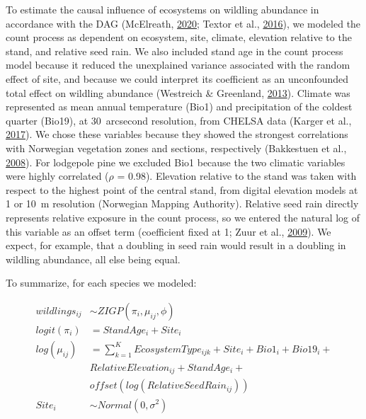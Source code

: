 \documentclass[
]{article}
\begin{document}
To estimate the causal influence of ecosystems on wildling abundance in accordance with the DAG (McElreath, \protect\hyperlink{ref-mcelreathHauntedDAGCausal2020}{2020}; Textor et al., \protect\hyperlink{ref-textorRobustCausalInference2016}{2016}), we modeled the count process as dependent on ecosystem, site, climate, elevation relative to the stand, and relative seed rain.
We also included stand age in the count process model because it reduced the unexplained variance associated with the random effect of site, and because we could interpret its coefficient as an unconfounded total effect on wildling abundance (Westreich \& Greenland, \protect\hyperlink{ref-westreichTableFallacyPresenting2013}{2013}).
Climate was represented as mean annual temperature (Bio1) and precipitation of the coldest quarter (Bio19), at 30~arcsecond resolution, from CHELSA data (Karger et al., \protect\hyperlink{ref-kargerClimatologiesHighResolution2017}{2017}).
We chose these variables because they showed the strongest correlations with Norwegian vegetation zones and sections, respectively (Bakkestuen et al., \protect\hyperlink{ref-bakkestuenSteplessModelsRegional2008}{2008}).
For lodgepole pine we excluded Bio1 because the two climatic variables were highly correlated (\(\rho\) = 0.98).
Elevation relative to the stand was taken with respect to the highest point of the central stand, from digital elevation models at 1 or 10~m resolution (Norwegian Mapping Authority).
Relative seed rain directly represents relative exposure in the count process, so we entered the natural log of this variable as an offset term (coefficient fixed at 1; Zuur et al., \protect\hyperlink{ref-zuurMixedEffectsModels2009}{2009}).
We expect, for example, that a doubling in seed rain would result in a doubling in wildling abundance, all else being equal.

To summarize, for each species we modeled:

\begin{equation}
\begin{aligned}
wildlings_{ij} &\sim ZIGP(\pi_{i}, \mu_{ij}, \phi) \\
logit(\pi_{i}) &= StandAge_{i} + Site_{i} \\
log(\mu_{ij}) &= \sum\limits_{k=1}^K EcosystemType_{ijk} + Site_{i} + Bio1_{i} + Bio19_{i} + \\
&RelativeElevation_{ij} + StandAge_{i} + \\
&offset(log(RelativeSeedRain_{ij})) \\
Site_{i} &\sim Normal(0, \sigma^2) \\
\end{aligned}
\end{equation}
\end{document}
